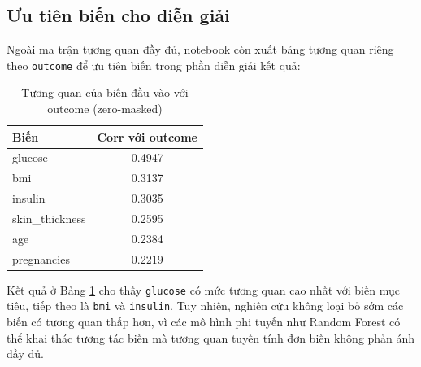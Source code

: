 \subsection{Ưu tiên biến cho diễn giải}
Ngoài ma trận tương quan đầy đủ, notebook còn xuất bảng tương quan riêng theo \texttt{outcome}
để ưu tiên biến trong phần diễn giải kết quả:
\begin{table}[H]
\centering
\caption{Tương quan của biến đầu vào với outcome (zero-masked)}
\label{tab:corr_outcome}
\begin{tabular}{lc}
\toprule
\textbf{Biến} & \textbf{Corr với outcome}\\
\midrule
glucose & 0.4947\\
bmi & 0.3137\\
insulin & 0.3035\\
skin\_thickness & 0.2595\\
age & 0.2384\\
pregnancies & 0.2219\\
\bottomrule
\end{tabular}
\end{table}

\noindent
Kết quả ở Bảng \ref{tab:corr_outcome} cho thấy \texttt{glucose} có mức tương quan cao nhất với biến mục tiêu,
tiếp theo là \texttt{bmi} và \texttt{insulin}. Tuy nhiên, nghiên cứu không loại bỏ sớm các biến có tương quan thấp hơn,
vì các mô hình phi tuyến như Random Forest có thể khai thác tương tác biến mà tương quan tuyến tính đơn biến không phản ánh đầy đủ.
